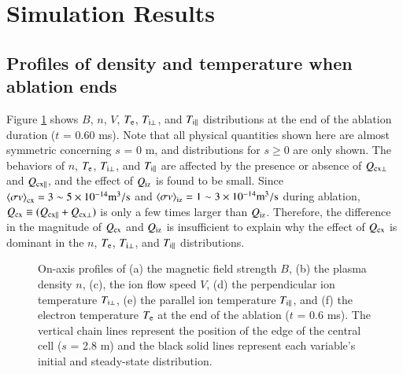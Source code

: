 \documentclass{jasse}%
\begin{document}
\section{Simulation Results}
\subsection{Profiles of density and temperature when ablation ends}
Figure \ref{fig_dist_val} shows $B$, $n$, $V$, $T_{\rm{e}}$, $T_{\rm{i\bot}}$, and $T_{\rm{i\parallel}}$ distributions at the end of the ablation duration ($t$ = 0.60 ms). Note that all physical quantities shown here are almost symmetric concerning $s$ = 0 m, and distributions for $s \geq 0$ are only shown. The behaviors of $n$, $T_{\rm{e}}$, $T_{\rm{i\bot}}$, and $T_{\rm{i\parallel}}$ are affected by the presence or absence of $Q_{\rm{cx\bot}}$ and $Q_{\rm{cx\parallel}}$, and the effect of $Q_{\rm{iz}}$ is found to be small. Since ${\left\langle \sigma v\right\rangle}_{\rm{cx}} = 3 \sim 5 \times 10^{-14} \rm{m}^{\rm{3}}/\rm{s}$ and ${\left\langle \sigma v\right\rangle}_{\rm{iz}} = 1 \sim 3 \times 10^{-14} \rm{m}^{\rm{3}}/\rm{s}$ during ablation, $Q_{\rm{cx}} \equiv (Q_{\rm{cx\parallel}}+Q_{\rm{cx\bot}})$ is only a few times larger than $Q_{\rm{iz}}$. Therefore, the difference in the magnitude of $Q_{\rm{cx}}$ and $Q_{\rm{iz}}$ is insufficient to explain why the effect of $Q_{\rm{cx}}$ is dominant in the $n$, $T_{\rm{e}}$, $T_{\rm{i\bot}}$, and $T_{\rm{i\parallel}}$ distributions.

\begin{figure}[t]
    \centering
    
    \caption{On-axis profiles of (a) the magnetic field strength $B$, (b) the plasma density $n$, 
    (c), the ion flow speed $V$, (d) the perpendicular ion temperature $T_{\rm{i\bot}}$, (e) the parallel ion temperature $T_{\rm{i\parallel}}$, and (f) the electron temperature $T_{\rm{e}}$ at the end of the ablation ($t$ = 0.6 ms). 
    The vertical chain lines represent the position of the 
    edge of the central cell ($s$ = 2.8 m) and the black solid lines represent 
    each variable's initial and steady-state distribution.} \label{fig_dist_val}
\end{figure}
\end{document}
